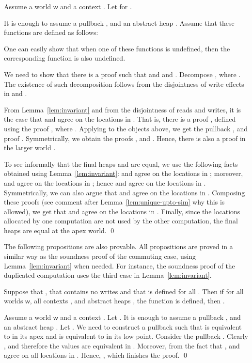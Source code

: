 \documentclass[orivec]{llncs}
\newif\iffull\fullfalse
\renewenvironment{proof}{\vspace{-1mm} \noindent {\bf Proof}\quad}{\qed}
\newcommand\w{\ensuremath{\mathsf{w}}\xspace}
\begin{document}
\begin{proof}
Assume a world \w and a context .
Let  for
. 

It is enough to assume a pullback 
, and an abstract heap . 
Assume that these functions are defined as follows:



\noindent
One can easily show that when one of these functions is undefined, then 
the corresponding function is also undefined. 

We need to show that there is a proof  such that
 and 
and .
Decompose , where
. 
The existence of such decomposition follows from the disjointness of write
effects in  and .

From Lemma~\ref{lem:invariant} and from 
the disjointness of reads and writes, it is the case that  and
 agree on the locations in .
That is, there is a proof , defined 
using the proof , where .
Applying  to the objects above,
we get the pullback , and  proof . Symmetrically, we obtain the proofs 
, and  . Hence, there is also a proof in the larger world .

To see informally that the final heaps  and  are
equal, we use
the following facts obtained using Lemma~\ref{lem:invariant}: 
and  agree on the locations in ; moreover, 
 and  agree on the locations in ; 
hence  and  agree on the locations in . Symmetrically, we can also argue that  and 
agree on the locations in . Composing these proofs 
(see comment after Lemma~\ref{lem:unique-upto-sim} why this is allowed), 
we get that  and  agree on the locations in . 
Finally, since the locations allocated by one computation are not used by
the other computation, the final heaps are equal at the
apex world.
\end{proof}

The following propositions are also provable. All propositions are proved
in a similar way as the soundness proof of the commuting case, using 
Lemma~\ref{lem:invariant} when needed. For instance, the soundness proof
of the duplicated computation uses the third case in
Lemma~\ref{lem:invariant}.

\begin{proposition}\label{dead}
Suppose that
,
that \iffull  \else 
 contains no writes \fi and that  is defined for all
. 
Then if for all worlds \w, all contexts , and abstract heaps ,
the function  is defined, 
then .
\end{proposition}

\begin{proof}
Assume a world \w and a context .
Let . 
It is enough to assume a pullback 
, and an abstract heap . Let . We need to construct a pullback such that  is equivalent
to  in its apex and  is equivalent to  in
its low point. Consider the pullback . Clearly
, and therefore the values are equivalent in .
Moreover, from the fact that ,  and  agree on all locations in .
Hence, , which finishes the proof. 
\end{proof}
\end{document}

